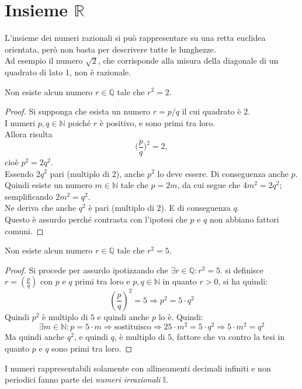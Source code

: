 \documentclass[a4paper,12pt, oneside]{book}
\begin{document}
\section{Insieme $\mathbb{R}$}
L'insieme dei numeri razionali si può rappresentare su una retta euclidea orientata, però non basta per descrivere tutte le lunghezze.\\
Ad esempio il numero $\sqrt{2}$, che corrisponde alla misura della diagonale di un quadrato di lato 1, non è razionale.
\begin{teorema}
Non esiste alcun numero $r\in\mathbb{Q}$ tale che $r^2=2$.
\end{teorema}
\begin{proof}
Si supponga che esista un numero $r=p/q$ il cui quadrato è 2.\\
I numeri $p,q\in\mathbb{N}$ poiché $r$ è positivo, e sono primi tra loro.\\
Allora risulta
$$\Big(\frac{p}{q}\Big)^2=2,$$
cioè $p^2=2q^2$.\\
Essendo $2q^2$ pari (multiplo di $2$), anche $p^2$ lo deve essere. Di conseguenza anche $p$.\\
Quindi esiste un numero $m\in\mathbb{N}$ tale che $p=2m$, da cui segue che $4m^2=2q^2$; semplificando $2m^2=q^2$.\\
Ne deriva che anche $q^2$ è pari (multiplo di $2$). E di conseguenza $q$.\\
Questo è assurdo perché contrasta con l'ipotesi che $p$ e $q$ non abbiano fattori comuni.
\end{proof}
\begin{teorema}
Non esiste alcun numero $r\in\mathbb{Q}$ tale che $r^2=5$.
\end{teorema}
\begin{proof}
Si procede per assurdo ipotizzando che $\exists r\in \mathbb{Q}:r^2=5$.
si definisce $r=\left(\frac{p}{q}\right)$ con $p$ e $q$ primi tra loro e $p,q\in \mathbb{N}$ in quanto $r>0$, si ha quindi:
$${\left(\frac{p}{q}\right)}^2=5\Rightarrow p^2=5\cdot q^2$$
Quindi $p^2$ è multiplo di $5$ e quindi anche $p$ lo è. Quindi:
$$\exists m\in\mathbb{N}:p=5\cdot m\Rightarrow\mbox{sostituisco}\Rightarrow 25\cdot m^2=5\cdot q^2\Rightarrow 5\cdot m^2=q^2$$
Ma quindi anche $q^2$, e quindi $q$, è multiplo di $5$, fattore che va contro la tesi in quanto $p$ e $q$ sono primi tra loro.
\end{proof}
I numeri rappresentabili solamente con allineamenti decimali infiniti e non periodici fanno parte dei \emph{numeri irrazionali} $\mathbb{I}$.\\
\end{document}
